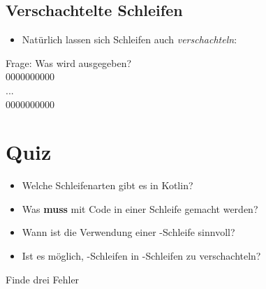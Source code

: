 \subsection{Verschachtelte Schleifen}
\begin{frame}
    \slidehead

    \begin{itemize}
        \item Natürlich lassen sich Schleifen auch \textit{verschachteln}:
            \vspace{0.1cm}
    \end{itemize}

    \begin{block}{Frage: Was wird ausgegeben?}
        \\
        0000000000\\
        ...\\
        0000000000\\
    \end{block}
\end{frame}

\livecoding

\section{Quiz}
\begin{frame}
    \slidehead
    \pause
    \begin{itemize}
        \item Welche Schleifenarten gibt es in Kotlin?\pause
        \item Was \textbf{muss} mit Code in einer Schleife gemacht werden?\pause
        \item Wann ist die Verwendung einer -Schleife sinnvoll?\pause
        \item Ist es möglich, -Schleifen in -Schleifen zu verschachteln?\pause
    \end{itemize}
    \begin{block}{Finde drei Fehler}
    \end{block}
\end{frame}

